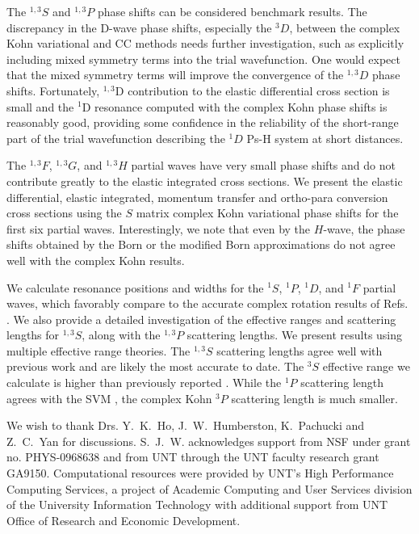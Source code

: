 \documentclass[preprint,showpacs,showkeys,preprintnumbers,amsmath,amssymb,longbibliography,pra,aps]{revtex4-1}
\begin{document}
The $^{1,3}S$ and $^{1,3}P$ phase shifts can be considered benchmark results. 
The discrepancy in the D-wave phase shifts, especially the $^3D$, between the 
complex Kohn variational and CC methods needs further investigation, such as 
explicitly including mixed symmetry terms into the trial wavefunction. One would 
expect that the mixed symmetry terms will improve the convergence of the $^{1,3}D$ 
phase shifts. Fortunately, $^{1,3}$D contribution to the elastic differential 
cross section is small and the $^1$D resonance computed with the complex Kohn 
phase shifts is reasonably good, providing some confidence in the reliability 
of the short-range part of the trial wavefunction describing the $^1D$ Ps-H 
system at short distances.

The $^{1,3}F$, $^{1,3}G$, and $^{1,3}H$ partial waves have very small phase 
shifts and do not contribute greatly to the elastic integrated cross 
sections. We present the elastic differential, elastic integrated, momentum 
transfer and ortho-para conversion cross sections using the $S$ matrix 
complex Kohn variational phase shifts for the first six partial waves. 
Interestingly, we note that even by the $H$-wave, the phase shifts obtained 
by the Born or the modified Born approximations do not agree well with the 
complex Kohn results.

We calculate resonance positions and widths for the $^1S$, $^1P$, $^1D$, and
$^1F$ partial waves, which favorably compare to the accurate complex 
rotation results of Refs. \cite{Yan1999,Yan1998a,Ho1998,Ho2000}. We also 
provide a detailed investigation of the effective ranges and scattering 
lengths for $^{1,3}S$, along with the $^{1,3}P$ scattering lengths. We 
present results using multiple effective range theories.
The $^{1,3}S$ scattering 
lengths agree well with previous work
\cite{VanReeth2003,Blackwood2002,Walters2004,Ivanov2002}
and are likely the most accurate to 
date. The $^3S$ effective range we calculate is higher than previously 
reported \cite{VanReeth2003,Blackwood2002,Ivanov2002}.
While the $^1P$ scattering length agrees with the SVM \cite{Ivanov2002}, 
the complex Kohn $^3P$ scattering length is much smaller.


\begin{acknowledgments}
We wish to thank Drs. Y.~K.~Ho, J.~W.~Humberston, K.~Pachucki and Z.~C.~Yan 
for discussions. S.~J.~W. acknowledges support from NSF under grant no.
PHYS-0968638 and from UNT through the UNT faculty research grant GA9150. 
Computational resources were provided by UNT's High Performance Computing 
Services, a project of Academic Computing and User Services division of the 
University Information Technology with additional support from UNT Office of 
Research and Economic Development.
\end{acknowledgments}



\end{document}
